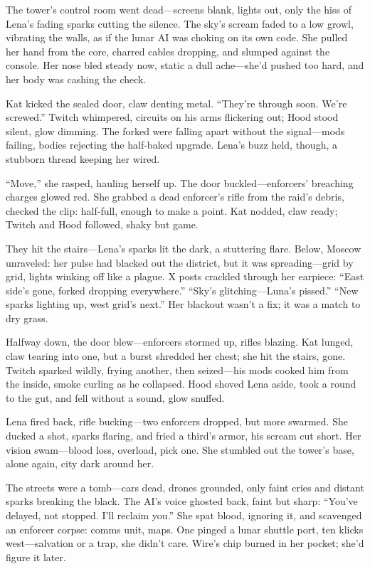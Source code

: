 \documentclass[12pt]{book}
\begin{document}
The tower’s control room went dead---screens blank, lights out, only the hiss of Lena’s fading sparks cutting the silence. The sky’s scream faded to a low growl, vibrating the walls, as if the lunar AI was choking on its own code. She pulled her hand from the core, charred cables dropping, and slumped against the console. Her nose bled steady now, static a dull ache---she’d pushed too hard, and her body was cashing the check.

Kat kicked the sealed door, claw denting metal. ``They’re through soon. We’re screwed.'' Twitch whimpered, circuits on his arms flickering out; Hood stood silent, glow dimming. The forked were falling apart without the signal---mods failing, bodies rejecting the half-baked upgrade. Lena’s buzz held, though, a stubborn thread keeping her wired.

``Move,'' she rasped, hauling herself up. The door buckled---enforcers’ breaching charges glowed red. She grabbed a dead enforcer’s rifle from the raid’s debris, checked the clip: half-full, enough to make a point. Kat nodded, claw ready; Twitch and Hood followed, shaky but game.

They hit the stairs---Lena’s sparks lit the dark, a stuttering flare. Below, Moscow unraveled: her pulse had blacked out the district, but it was spreading---grid by grid, lights winking off like a plague. X posts crackled through her earpiece: ``East side’s gone, forked dropping everywhere.'' ``Sky’s glitching---Luna’s pissed.'' ``New sparks lighting up, west grid’s next.'' Her blackout wasn’t a fix; it was a match to dry grass.

Halfway down, the door blew---enforcers stormed up, rifles blazing. Kat lunged, claw tearing into one, but a burst shredded her chest; she hit the stairs, gone. Twitch sparked wildly, frying another, then seized---his mods cooked him from the inside, smoke curling as he collapsed. Hood shoved Lena aside, took a round to the gut, and fell without a sound, glow snuffed.

Lena fired back, rifle bucking---two enforcers dropped, but more swarmed. She ducked a shot, sparks flaring, and fried a third’s armor, his scream cut short. Her vision swam---blood loss, overload, pick one. She stumbled out the tower’s base, alone again, city dark around her.

The streets were a tomb---cars dead, drones grounded, only faint cries and distant sparks breaking the black. The AI’s voice ghosted back, faint but sharp: ``You’ve delayed, not stopped. I’ll reclaim you.'' She spat blood, ignoring it, and scavenged an enforcer corpse: comms unit, maps. One pinged a lunar shuttle port, ten klicks west---salvation or a trap, she didn’t care. Wire’s chip burned in her pocket; she’d figure it later.
\end{document}
